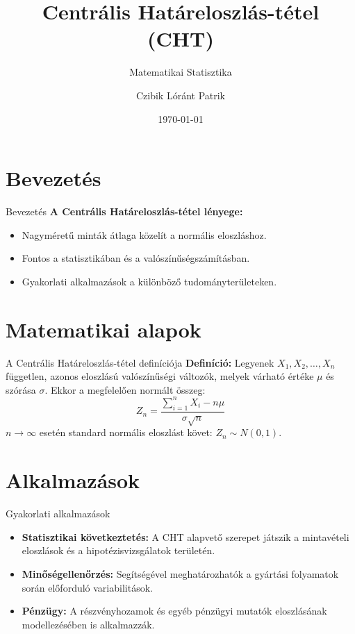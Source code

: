 \documentclass[aspectratio=169,12pt]{beamer}
\title{Centrális Határeloszlás-tétel (CHT)}
\subtitle{Matematikai Statisztika}
\author{Czibik Lóránt Patrik}
\institute{Miskolci Egyetem}
\date{\today}
\begin{document}
	\begin{frame}
		\titlepage
	\end{frame}
	
	\section{Bevezetés}
	\begin{frame}{Bevezetés}
		\textbf{A Centrális Határeloszlás-tétel lényege:}
		\begin{itemize}
			\item Nagyméretű minták átlaga közelít a normális eloszláshoz.
			\item Fontos a statisztikában és a valószínűségszámításban.
			\item Gyakorlati alkalmazások a különböző tudományterületeken.
		\end{itemize}
	\end{frame}
	
	\section{Matematikai alapok}
	\begin{frame}{A Centrális Határeloszlás-tétel definíciója}
		\textbf{Definíció:} Legyenek $X_1, X_2, \ldots, X_n$ független, azonos eloszlású valószínűségi változók, melyek várható értéke $\mu$ és szórása $\sigma$. Ekkor a megfelelően normált összeg:
		\begin{equation}
			Z_n = \frac{\sum_{i=1}^{n} X_i - n\mu}{\sigma \sqrt{n}}
		\end{equation}
		$n \to \infty$ esetén standard normális eloszlást követ: $Z_n \sim N(0,1)$.
	\end{frame}
	
	
	\section{Alkalmazások}
	\begin{frame}{Gyakorlati alkalmazások}
		\begin{itemize}
			\item \textbf{Statisztikai következtetés:} A CHT alapvető szerepet játszik a mintavételi eloszlások és a hipotézisvizsgálatok területén.
			\item \textbf{Minőségellenőrzés:} Segítségével meghatározhatók a gyártási folyamatok során előforduló variabilitások.
			\item \textbf{Pénzügy:} A részvényhozamok és egyéb pénzügyi mutatók eloszlásának modellezésében is alkalmazzák.
		\end{itemize}
	\end{frame}
	
\end{document}
